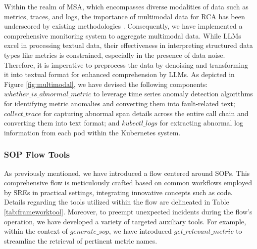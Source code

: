 Within the realm of MSA, which encompasses diverse modalities of data such as metrics, traces, and logs, the importance of multimodal data for RCA has been underscored by existing methodologies \citep{yao2024chain,yu2023nezha}. Consequently, we have implemented a comprehensive monitoring system to aggregate multimodal data. While LLMs excel in processing textual data, their effectiveness in interpreting structured data types like metrics is constrained, especially in the presence of data noise. Therefore, it is imperative to preprocess the data by denoising and transforming it into textual format for enhanced comprehension by LLMs. As depicted in Figure \ref{fig:multimodal}, we have devised the following components: $whether\_is\_abnormal\_metric$ to leverage time series anomaly detection algorithms \citep{wang2024revisiting,donut,tuli2022tranad} for identifying metric anomalies and converting them into fault-related text; $collect\_trace$ for capturing abnormal span details across the entire call chain and converting them into text format; and $kubectl\_logs$ for extracting abnormal log information from each pod within the Kubernetes system.

\subsubsection{SOP Flow Tools}


As previously mentioned, we have introduced a flow centered around SOPs. This comprehensive flow is meticulously crafted based on common workflows employed by SREs in practical settings, integrating innovative concepts such as code. Details regarding the tools utilized within the flow are delineated in Table \ref{tab:frameworktool}. Moreover, to preempt unexpected incidents during the flow's operation, we have developed a variety of targeted auxiliary tools. For example, within the context of $generate\_sop$, we have introduced $get\_relevant\_metric$ to streamline the retrieval of pertinent metric names.



